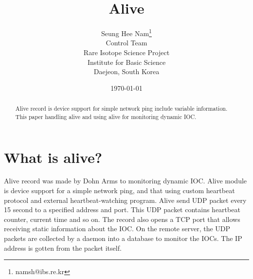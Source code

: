 \documentclass[11pt
  , a4paper
  , article
  , oneside
]{memoir}
\begin{document}
\newcommand{\technumber}{
  RAON Control-Document Series\\
  Revision : v0.1,   Release : 2015. 05. 29}
\title{\textbf{Alive}}

\author{Seung Hee Nam\thanks{namsh@ibs.re.kr} \\
  Control Team \\
  Rare Isotope Science Project\\
  Institute for Basic Science\\
  Daejeon, South Korea
}

\date{\today}

\renewcommand{\maketitlehooka}{\begin{flushright}\textsf{\technumber}\end{flushright}}

\maketitle

\begin{abstract}
Alive record is device support for simple network ping include variable information. This paper handling alive and using alive for monitoring dynamic IOC.
\end{abstract}



\chapter{What is alive?}
Alive record was made by Dohn Arms to monitoring dynamic IOC. Alive module is device support for a simple network ping, and that using custom heartbeat protocol and external heartbeat-watching program. Alive send UDP packet every 15 second to a specified address and port. This UDP packet contains  heartbeat counter, current time and so on. The record also opens a TCP port that allows receiving static information about the IOC. On the remote server, the UDP packets are collected by a daemon into a database to monitor the IOCs. The IP address is gotten from the packet itself.
\end{document}
